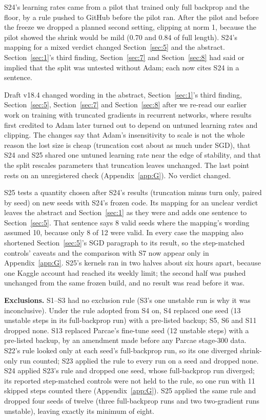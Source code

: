 \documentclass[10pt]{article}
\begin{document}
S24's learning rates came from a pilot that trained only full backprop and the floor, by a rule pushed to GitHub before the pilot ran. After the pilot and before the freeze we dropped a planned second setting, clipping at norm 1, because the pilot showed the shrink would be mild (0.70 and 0.84 of full length). S24's mapping for a mixed verdict changed Section~\ref{sec:5} and the abstract. Section~\ref{sec:1}'s third finding, Section~\ref{sec:7} and Section~\ref{sec:8} had said or implied that the split was untested without Adam; each now cites S24 in a sentence.

Draft v18.4 changed wording in the abstract, Section~\ref{sec:1}'s third finding, Section~\ref{sec:5}, Section~\ref{sec:7} and Section~\ref{sec:8} after we re-read our earlier work on training with truncated gradients in recurrent networks, where results first credited to Adam later turned out to depend on untuned learning rates and clipping. The changes say that Adam's insensitivity to scale is not the whole reason the lost size is cheap (truncation cost about as much under SGD), that S24 and S25 shared one untuned learning rate near the edge of stability, and that the split rescales parameters that truncation leaves unchanged. The last point rests on an unregistered check (Appendix~\ref{app:G}). No verdict changed.

S25 tests a quantity chosen after S24's results (truncation minus turn only, paired by seed) on new seeds with S24's frozen code. Its mapping for an unclear verdict leaves the abstract and Section~\ref{sec:1} as they were and adds one sentence to Section~\ref{sec:5}. That sentence says 8 valid seeds where the mapping's wording assumed 10, because only 8 of 12 were valid. In every case the mapping also shortened Section~\ref{sec:5}'s SGD paragraph to its result, so the step-matched controls' caveats and the comparison with S7 now appear only in Appendix~\ref{app:G}. S25's kernels ran in two halves about six hours apart, because one Kaggle account had reached its weekly limit; the second half was pushed unchanged from the same frozen build, and no result was read before it was.

\textbf{Exclusions.} S1--S3 had no exclusion rule (S3's one unstable run is why it was inconclusive). Under the rule adopted from S4 on, S4 replaced one seed (13 unstable steps in its full-backprop run) with a pre-listed backup; S5, S6 and S11 dropped none. S13 replaced Parcae's fine-tune seed (12 unstable steps) with a pre-listed backup, by an amendment made before any Parcae stage-300 data. S22's rule looked only at each seed's full-backprop run, so its one diverged shrink-only run counted; S23 applied the rule to every run on a seed and dropped none. S24 applied S23's rule and dropped one seed, whose full-backprop run diverged; its reported step-matched controls were not held to the rule, so one run with 11 skipped steps counted there (Appendix~\ref{app:G}). S25 applied the same rule and dropped four seeds of twelve (three full-backprop runs and two two-gradient runs unstable), leaving exactly its minimum of eight.
\end{document}
